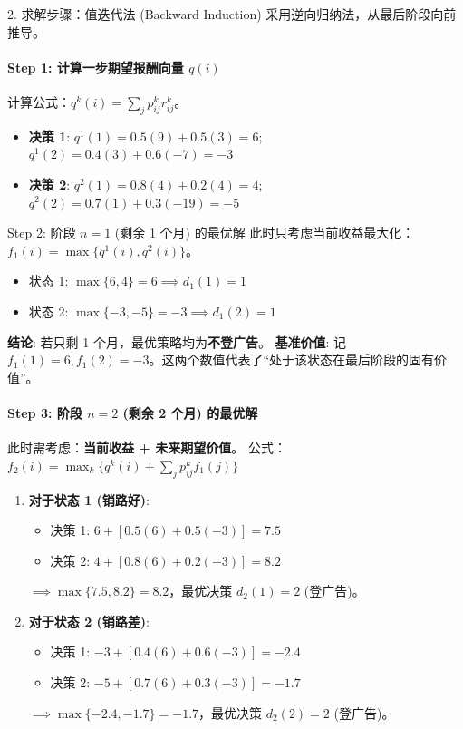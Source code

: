 \documentclass[a4paper,12pt]{ctexart} %
\begin{document}
	2. 求解步骤：值迭代法 (Backward Induction)
	采用逆向归纳法，从最后阶段向前推导。
	
	\paragraph{Step 1: 计算一步期望报酬向量 $q(i)$}
	计算公式：$q^k(i) = \sum_{j} p_{ij}^k r_{ij}^k$。
	\begin{itemize}
		\item \textbf{决策 1}:
		$q^1(1) = 0.5(9) + 0.5(3) = 6$; \quad
		$q^1(2) = 0.4(3) + 0.6(-7) = -3$
		\item \textbf{决策 2}:
		$q^2(1) = 0.8(4) + 0.2(4) = 4$; \quad
		$q^2(2) = 0.7(1) + 0.3(-19) = -5$
	\end{itemize}
	
	Step 2: 阶段 $n=1$ (剩余 1 个月) 的最优解
	此时只考虑当前收益最大化：$f_1(i) = \max \{ q^1(i), q^2(i) \}$。
	\begin{itemize}
		\item 状态 1: $\max\{6, 4\} = 6 \implies d_1(1)=1$
		\item 状态 2: $\max\{-3, -5\} = -3 \implies d_1(2)=1$
	\end{itemize}
	\textbf{结论}: 若只剩 1 个月，最优策略均为\textbf{不登广告}。
	\textbf{基准价值}: 记 $f_1(1)=6, f_1(2)=-3$。这两个数值代表了“处于该状态在最后阶段的固有价值”。
	
	\paragraph{Step 3: 阶段 $n=2$ (剩余 2 个月) 的最优解}
	此时需考虑：\textbf{当前收益 + 未来期望价值}。
	公式：$f_2(i) = \max_{k} \{ q^k(i) + \sum_{j} p_{ij}^k f_1(j) \}$
	
	\begin{enumerate}
		\item \textbf{对于状态 1 (销路好)}:
		\begin{itemize}
			\item 决策 1: $6 + [0.5(6) + 0.5(-3)] = 7.5$
			\item 决策 2: $4 + [0.8(6) + 0.2(-3)] = 8.2$
		\end{itemize}
		$\implies \max\{7.5, 8.2\} = 8.2$，最优决策 $d_2(1)=2$ (登广告)。
		
		\item \textbf{对于状态 2 (销路差)}:
		\begin{itemize}
			\item 决策 1: $-3 + [0.4(6) + 0.6(-3)] = -2.4$
			\item 决策 2: $-5 + [0.7(6) + 0.3(-3)] = -1.7$
		\end{itemize}
		$\implies \max\{-2.4, -1.7\} = -1.7$，最优决策 $d_2(2)=2$ (登广告)。
	\end{enumerate}
	
\end{document}
